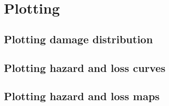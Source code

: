 \chapter{Plotting}
\label{chap-plotting}


	\section{Plotting damage distribution}
	\label{sec:plot-damage}
	
	
	\section{Plotting hazard and loss curves}
	\label{sec:plot-curves}
	
	
	\section{Plotting hazard and loss maps}
	\label{sec:plot-maps}
	
